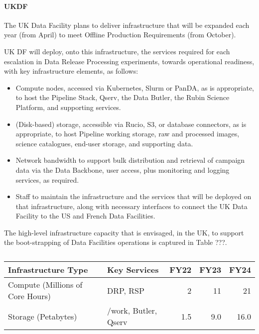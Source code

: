  
\paragraph{UKDF}

The UK Data Facility plans to deliver infrastructure that will be expanded each year (from April) to meet Offline Production Requirements (from October).

UK DF will deploy, onto this infrastructure, the services required for each escalation in Data Release Processing experiments, towards operational readiness, with key infrastructure elements, as follows:

\begin{itemize}

\item Compute nodes, accessed via Kubernetes, Slurm or PanDA, as is appropriate, to host the Pipeline Stack, Qserv, the Data Butler, the Rubin Science Platform, and supporting services.

\item (Disk-based) storage, accessible via Rucio, S3, or database connectors, as is appropriate, to host Pipeline working storage, raw and processed images, science catalogues, end-user storage, and supporting data.

\item Network bandwidth to support bulk distribution and retrieval of campaign data via the Data Backbone, user access, plus monitoring and logging services, as required.

  \item Staff to maintain the infrastructure and the services that will be deployed on that infrastructure, along with necessary interfaces to connect the UK Data Facility to the US and French Data Facilities.
  
\end{itemize}

The high-level infrastructure capacity that is envisaged, in the UK, to support the boot-strapping of Data Facilities operations is captured in Table ???.


\begin{longtable} {|l  |l  |r  |r |r  |}
  \caption{\label{tab:ukdfInfrastructure}}
  \\
  \hline
  {\bf Infrastructure Type} & {\bf Key Services} & {\bf FY22} & {\bf FY23} & {\bf FY24} \\
  \hline
  Compute (Millions of Core Hours) & DRP, RSP & 2 & 11 & 21 \\
  \hline
  Storage (Petabytes) & /work, Butler, Qserv & 1.5 & 9.0 & 16.0 \\
  \hline
\end{longtable}
  
